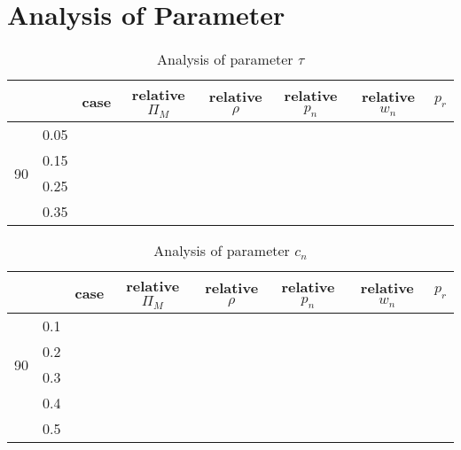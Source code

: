 \documentclass[a4paper,10pt]{article}
\newcommand\tabrotate[1]{\begin{turn}{90}\rlap{#1}\end{turn}}
\begin{document}
\section{Analysis of Parameter}
\begin{table}[htp]
	\begin{center}
		\begin{small}
			\begin{tabular}{cc|cccccc}
				&&case&relative $\Pi_M$&relative $\rho$&relative $p_n$&relative $w_n$&$p_r$\\
				\hline
				\multirow{4}{*}{\tabrotate{$\tau$}} &0.05&&&&&\\
				&0.15&&&&&&\\
				&0.25&&&&&&\\
				&0.35&&&&&&\\
			\end{tabular}
			\caption{Analysis of parameter $\tau$}
			\label{table_fullfactorial}
		\end{small}
	\end{center}
\end{table}

\begin{table}[htp]
	\begin{center}
		\begin{small}
			\begin{tabular}{cc|cccccc}
				&&case&relative $\Pi_M$&relative $\rho$&relative $p_n$&relative $w_n$&$p_r$\\
				\hline
				\multirow{4}{*}{\tabrotate{$c_n$}} &0.1&&&&&\\
				&0.2&&&&&&\\
				&0.3&&&&&&\\
				&0.4&&&&&&\\
				&0.5&&&&&&\\
			\end{tabular}
			\caption{Analysis of parameter $c_n$}
			\label{table_fullfactorial}
		\end{small}
	\end{center}
\end{table} 
\end{document}
